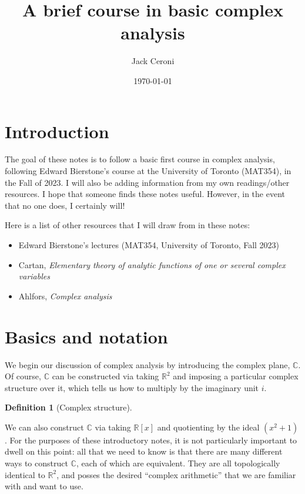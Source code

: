 \documentclass[aps,pra,showpacs,notitlepage,onecolumn,superscriptaddress,nofootinbib]{revtex4-1}
\theoremstyle{definition}
\newtheorem{definition}{Definition}[section]
\begin{document}
\title{A brief course in basic complex analysis}
\author{Jack Ceroni}

\date{\today}

\maketitle

\tableofcontents

\section{Introduction}

\noindent The goal of these notes is to follow a basic first course in complex analysis, following Edward Bierstone's course at the University of Toronto (MAT354), in the Fall of 2023. I will
also be adding information from my own readings/other resources. I hope that someone finds these notes useful. However, in the event that no one does, I certainly will!

Here is a list of other resources that I will draw from in these notes:

\begin{itemize}
  \item Edward Bierstone's lectures (MAT354, University of Toronto, Fall 2023)
  \item Cartan, \textit{Elementary theory of analytic functions of one or several complex variables}
  \item Ahlfors, \textit{Complex analysis}
  \end{itemize}

\section{Basics and notation}

\noindent We begin our discussion of complex analysis by introducing the complex plane, $\mathbb{C}$. Of course, $\mathbb{C}$ can be constructed via taking $\mathbb{R}^{2}$ and imposing a particular
complex structure over it, which tells us how to multiply by the imaginary unit $i$.

\begin{definition}[Complex structure]
  \end{definition}

\noindent We can also construct $\mathbb{C}$ via taking $\mathbb{R}[x]$ and quotienting by the ideal $(x^2 + 1)$.
For the purposes of these introductory notes, it is not particularly important to dwell on this point: all that
we need to know is that there are many different ways to construct $\mathbb{C}$, each of which are equivalent. They are all topologically identical to $\mathbb{R}^2$, and posses the desired ``complex arithmetic'' that we are familiar with
and want to use.
\end{document}
